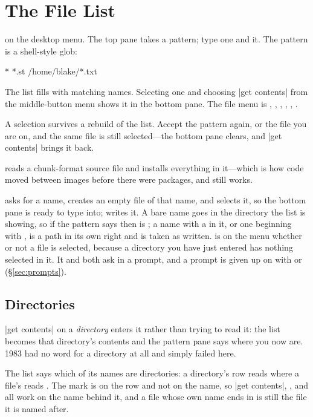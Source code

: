 \section{The File List}
\label{sec:filelist}

 on the desktop menu. The top pane takes a pattern; type one and
 it. The pattern is a shell-style glob:

\begin{st}
*
*.st
/home/blake/*.txt
\end{st}

The list fills with matching names. Selecting one and choosing
\ct|get contents| from the middle-button menu shows it in the bottom pane. The
file menu is , , , ,
, .

A selection survives a rebuild of the list. Accept the pattern again, or
 the file you are on, and the same file is still selected---the
bottom pane clears, and \ct|get contents| brings it back.

 reads a chunk-format source file and installs everything in
it---which is how code moved between images before there were packages, and
still works.

 asks for a name, creates an empty file of that name, and selects it,
so the bottom pane is ready to type into;  writes it. A bare name
goes in the directory the list is showing, so if the pattern says 
then  is ; a name with a \ctp{/} in it, or
one beginning with \ctp{\textasciitilde}, is a path in its own right and is
taken as written.  is on the menu whether or not a file is selected,
because a directory you have just entered has nothing selected in it. It and
 both ask in a prompt, and a prompt is given up on with 
or  (\S\ref{sec:prompts}).

\subsection{Directories}

\ct|get contents| on a \emph{directory} enters it rather than trying to read
it: the list becomes that directory's contents and the pattern pane says where
you now are. 1983 had no word for a directory at all and simply failed here.

The list says which of its names are directories: a directory's row reads
 where a file's reads . The mark is on the row and not
on the name, so \ct|get contents|, ,  and 
all work on the name behind it, and a file whose own name ends in
 is still the file it is named after.

